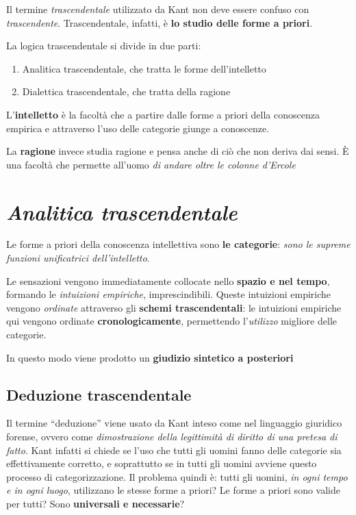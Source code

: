 \documentclass[a4paper, twoside, titlepage]{book}
\begin{document}
Il termine \textit{trascendentale} utilizzato da Kant non deve essere confuso con \textit{trascendente}. Trascendentale, infatti, è \textbf{lo studio delle forme a priori}.

La logica trascendentale si divide in due parti:
\begin{enumerate}
\item Analitica trascendentale, che tratta le forme dell’intelletto
\item Dialettica trascendentale, che tratta della ragione
\end{enumerate}

L’\textbf{intelletto} è la facoltà che a partire dalle forme a priori della conoscenza empirica e attraverso l’uso delle categorie giunge a conoscenze.

La \textbf{ragione} invece studia ragione e pensa anche di ciò che non deriva dai sensi. È una facoltà che permette all’uomo \textit{di andare oltre le colonne d’Ercole}

\section{\textit{Analitica trascendentale}}

Le forme a priori della conoscenza intellettiva sono \textbf{le categorie}: \textit{sono le supreme funzioni unificatrici dell’intelletto}.

Le sensazioni vengono immediatamente collocate nello \textbf{spazio e nel tempo}, formando le \textit{intuizioni empiriche}, imprescindibili.
Queste intuizioni empiriche vengono \textit{ordinate} attraverso gli \textbf{schemi trascendentali}: le intuizioni empiriche qui vengono ordinate \textbf{cronologicamente}, permettendo l’\textit{utilizzo} migliore delle categorie.

In questo modo viene prodotto un \textbf{giudizio sintetico a posteriori}

\subsection{Deduzione trascendentale}

Il termine “deduzione” viene usato da Kant inteso come nel linguaggio giuridico forense, ovvero come \textit{dimostrazione della legittimità di diritto di una pretesa di fatto}.
Kant infatti si chiede se l’uso che tutti gli uomini fanno delle categorie sia effettivamente corretto, e soprattutto se in tutti gli uomini avviene questo processo di categorizzazione. 
Il problema quindi è: tutti gli uomini, \textit{in ogni tempo e in ogni luogo}, utilizzano le stesse forme a priori? Le forme a priori sono valide per tutti?
Sono \textbf{universali e necessarie}?
\end{document}
